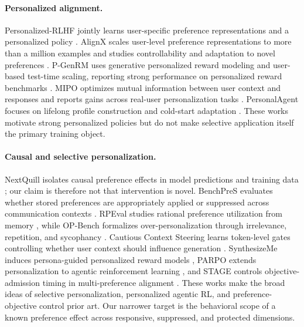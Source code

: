 \documentclass[10pt]{article}
\begin{document}
\paragraph{Personalized alignment.}
Personalized-RLHF jointly learns user-specific preference representations and a personalized policy \citep{prlhf}. AlignX scales user-level preference representations to more than a million examples and studies controllability and adaptation to novel preferences \citep{alignx}. P-GenRM uses generative personalized reward modeling and user-based test-time scaling, reporting strong performance on personalized reward benchmarks \citep{pgenrm}. MIPO optimizes mutual information between user context and responses and reports gains across real-user personalization tasks \citep{mipo}. PersonalAgent focuses on lifelong profile construction and cold-start adaptation \citep{personalagent}. These works motivate strong personalized policies but do not make selective application itself the primary training object.

\paragraph{Causal and selective personalization.}
NextQuill isolates causal preference effects in model predictions and training data \citep{nextquill}; our claim is therefore not that intervention is novel. BenchPreS evaluates whether stored preferences are appropriately applied or suppressed across communication contexts \citep{benchpres}. RPEval studies rational preference utilization from memory \citep{rpeval}, while OP-Bench formalizes over-personalization through irrelevance, repetition, and sycophancy \citep{opbench}. Cautious Context Steering learns token-level gates controlling whether user context should influence generation \citep{ccs}. SynthesizeMe induces persona-guided personalized reward models \citep{synthesizeme}, PARPO extends personalization to agentic reinforcement learning \citep{parpo}, and STAGE controls objective-admission timing in multi-preference alignment \citep{stage}. These works make the broad ideas of selective personalization, personalized agentic RL, and preference-objective control prior art. Our narrower target is the behavioral scope of a known preference effect across responsive, suppressed, and protected dimensions.
\end{document}
